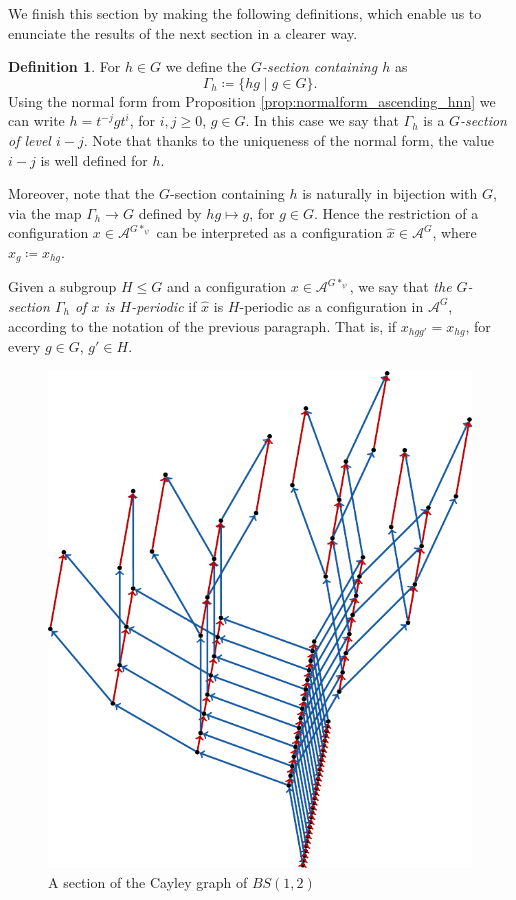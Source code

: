 \documentclass[letterpaper,11pt,reqno]{amsart}
\theoremstyle{plain}
\theoremstyle{definition}
\newtheorem{definition}{Definition}[section]
\theoremstyle{cupremark}
\begin{document}
We finish this section by making the following definitions, which enable us to enunciate the results of the next section in a clearer way.
\begin{definition}
	For $h\in G$ we define the \textit{$G$-section containing $h$} as
	$$
	\Gamma_{h}\coloneqq \{hg\mid g\in G \}.
	$$
	Using the normal form from Proposition \ref{prop:normalform_ascending_hnn} we can write $h=t^{-j}gt^i$, for $i,j\ge 0$, $g\in G$. In this case we say that $\Gamma_h$ is a \textit{$G$-section of level $i-j$}. Note that thanks to the uniqueness of the normal form, the value $i-j$ is well defined for $h$.
	
	Moreover, note that the $G$-section containing $h$ is naturally in bijection with $G$, via the map $\Gamma_h\to G$ defined by $hg\mapsto g$, for $g\in G$. Hence the restriction of a configuration $x\in \mathcal{A}^{G*_{\psi}}$ can be interpreted as a configuration $\hat{x}\in \mathcal{A}^{G}$, where $\hat{x}_{g}\coloneqq x_{hg}$.
	
	Given a subgroup $H\leqslant G$ and a configuration $x\in \mathcal{A}^{G*_{\psi}}$, we say that \textit{the $G$-section $\Gamma_h$ of $x$ is $H$-periodic} if $\hat{x}$ is $H$-periodic as a configuration in $\mathcal{A}^{G}$, according to the notation of the previous paragraph. That is, if $x_{hgg'}=x_{hg}$,  for every $g\in G$, $g'\in H$.
\end{definition}
\begin{figure}[h]
	\centering
	\includegraphics[scale=0.8]{bs_section.pdf}
	\caption{A section of the Cayley graph of $BS(1,2)$}
	\label{fig:section_cayley_graph_bs}
\end{figure}
\end{document}
